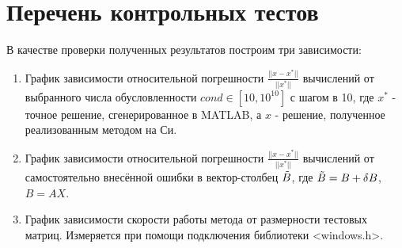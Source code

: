 \documentclass[12pt]{article}
\begin{document}
\section{Перечень контрольных тестов}
В качестве проверки полученных результатов построим три зависимости:\\
\begin{enumerate}
    \item График зависимости относительной погрешности $\frac{|| x - x^{*} ||}{|| x^{*} ||}$ вычислений от выбранного числа обусловленности $cond \in [10,10^{10}]$ с шагом в 10, где $x^{*}$ - точное решение, сгенерированное в MATLAB, а $x$ - решение, полученное реализованным методом на Си.\\
    \item График зависимости относительной погрешности $\frac{|| x - x^{*} ||}{|| x^{*} ||}$ вычислений от самостоятельно внесённой ошибки в вектор-столбец $\Tilde{B}$, где $\Tilde{B} = B +\delta B$, $B = AX$.\\
    \item График зависимости скорости работы метода от размерности тестовых матриц. Измеряется при помощи подключения библиотеки <windows.h>.
\end{enumerate}


\newpage
\end{document}
